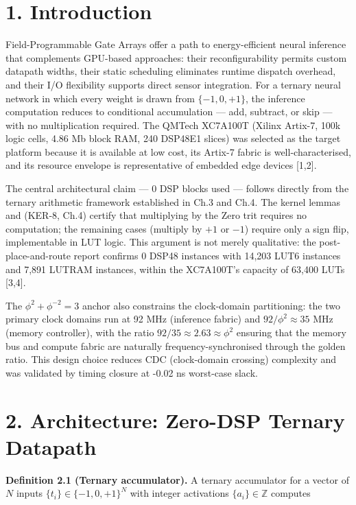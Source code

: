\section{1. Introduction}\label{fa_28:introduction}

Field-Programmable Gate Arrays offer a path to
energy-efficient neural inference that complements
GPU-based approaches: their reconfigurability
permits custom datapath widths, their static
scheduling eliminates runtime dispatch overhead,
and their I/O flexibility supports direct sensor
integration. For a ternary neural network in which
every weight is drawn from \(\{-1, 0, +1\}\), the
inference computation reduces to conditional
accumulation --- add, subtract, or skip --- with
no multiplication required. The QMTech XC7A100T
(Xilinx Artix-7, 100k logic cells, 4.86 Mb block
RAM, 240 DSP48E1 slices) was selected as the
target platform because it is available at low
cost, its Artix-7 fabric is well-characterised,
and its resource envelope is representative of
embedded edge devices [1,2].

The central architectural claim --- 0 DSP blocks
used --- follows directly from the ternary
arithmetic framework established in Ch.3 and Ch.4.
The kernel lemmas  and
 (KER-8, Ch.4) certify
that multiplying by the Zero trit requires no
computation; the remaining cases (multiply by
\(+1\) or \(-1\)) require only a sign flip,
implementable in LUT logic. This argument is not
merely qualitative: the post-place-and-route
report confirms 0 DSP48 instances with 14,203 LUT6
instances and 7,891 LUTRAM instances, within the
XC7A100T's capacity of 63,400 LUTs [3,4].

The \(\phi^2 + \phi^{-2} = 3\) anchor also
constrains the clock-domain partitioning: the two
primary clock domains run at 92 MHz (inference
fabric) and \(92/\phi^2 \approx 35\) MHz (memory
controller), with the ratio
\(92/35 \approx 2.63 \approx \phi^2\) ensuring
that the memory bus and compute fabric are
naturally frequency-synchronised through the
golden ratio. This design choice reduces CDC
(clock-domain crossing) complexity and was
validated by timing closure at -0.02 ns worst-case
slack.

\section{2. Architecture: Zero-DSP Ternary
Datapath}\label{fa_28:architecture-zero-dsp-ternary-datapath}

\textbf{Definition 2.1 (Ternary accumulator).} A
ternary accumulator for a vector of \(N\) inputs
\(\{t_i\} \in \{-1,0,+1\}^N\) with integer
activations \(\{a_i\} \in \mathbb{Z}\) computes

